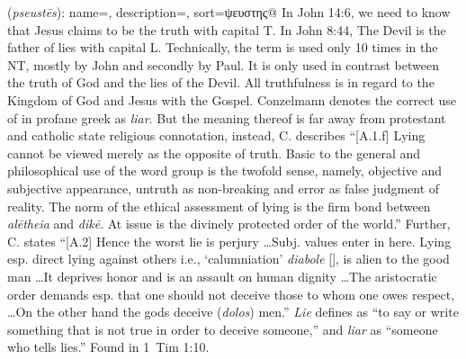 \item[Liar,]

(\textit{pseustēs}):
{
    name=,
    description={},
    sort=ψευστης@
}
In John 14:6, we need to know that Jesus claims to be the truth with capital T. In John 8:44, The Devil is the father of lies with capital L. Technically, the term  is used only 10 times in the NT, mostly by John and secondly by Paul. It is only used in contrast between the truth of God and the lies of the Devil. All truthfulness is in regard to the Kingdom of God and Jesus with the Gospel. 
Conzelmann denotes the correct use of  in profane greek as \emph{liar}. But the meaning thereof is far away from protestant and catholic state religious connotation, instead, C. describes ``[A.1.f] Lying cannot be viewed merely as the opposite of truth. Basic to the general and philosophical use of the word group is the twofold sense, namely, objective and subjective appearance, untruth as non-breaking and error as false judgment of reality. The norm of the ethical assessment of lying is the firm bond between \emph{alētheia} and \emph{dikē}. At issue is the divinely protected order of the world.'' 
Further, C. states ``[A.2] Hence the worst lie is perjury \ldots Subj. values enter in here. Lying esp. direct lying against others i.e., `calumniation' \emph{diabole} [], is alien to the good man \ldots It deprives honor and is an assault on human dignity \ldots The aristocratic order demands esp. that one should not deceive those to whom one owes respect, \ldots On the other hand the gods deceive (\emph{dolos}) men.''
\emph{Lie} defines as ``to say or write something that is not true in order to deceive someone,'' and \emph{liar} as ``someone who tells lies.''
Found in 1~Tim 1:10.
